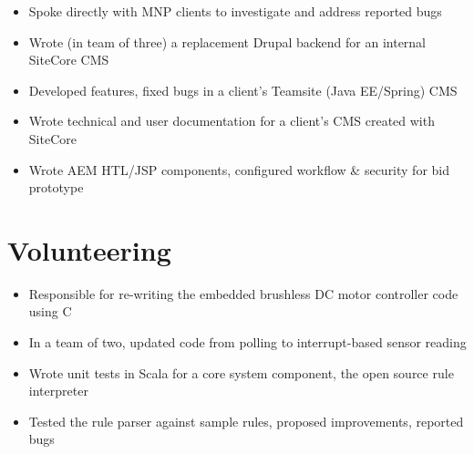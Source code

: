 \documentclass[]{rcf_cv}
\begin{document}
		\begin{itemize}
			\setlength\itemsep{-0.4em}
			\renewcommand\labelitemi{--}
			
			\item Spoke directly with MNP clients to investigate and address reported bugs
			\item Wrote (in team of three) a replacement Drupal backend for an internal SiteCore CMS
			\item Developed features, fixed bugs in a client's Teamsite (Java EE/Spring) CMS
			\item Wrote technical and user documentation for a client's CMS created with SiteCore 
			\item Wrote AEM HTL/JSP components, configured workflow \& security for bid prototype

			
		\end{itemize}
	
	\section{Volunteering}
	
		\begin{itemize}
			\setlength\itemsep{-0.4em}
			\renewcommand\labelitemi{--}
			
			\item Responsible for re-writing the embedded brushless DC motor controller code using C
			\item In a team of two, updated code from polling to interrupt-based sensor reading
			
		\end{itemize}
	
		\begin{itemize}
			\setlength\itemsep{-0.4em}
			\renewcommand\labelitemi{--}
			
			\item Wrote unit tests in Scala for a core system component, the open source rule interpreter
			\item Tested the rule parser against sample rules, proposed improvements, reported bugs

		\end{itemize}
\end{document}
